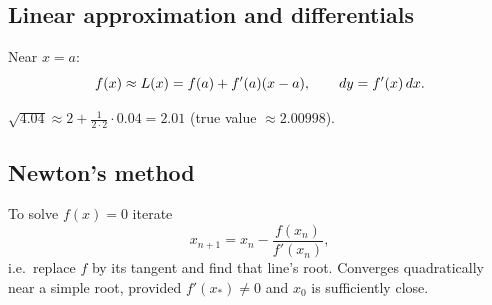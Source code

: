 \subsection{Linear approximation and differentials}
Near $x = a$:
\[ f(x) \approx L(x) = f(a) + f'(a)(x - a), \qquad dy = f'(x) \,dx. \]

\begin{example}
$\sqrt{4.04} \approx 2 + \tfrac{1}{2\cdot 2}\cdot 0.04 = 2.01$ (true value $\approx 2.00998$).
\end{example}

\subsection{Newton's method}
To solve $f(x) = 0$ iterate
\[ x_{n+1} = x_n - \frac{f(x_n)}{f'(x_n)}, \]
i.e.\ replace $f$ by its tangent and find that line's root. Converges quadratically near
a simple root, provided $f'(x_*) \neq 0$ and $x_0$ is sufficiently close.
